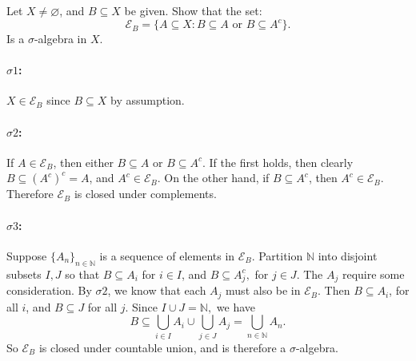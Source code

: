 \documentclass{article}
\begin{document}
\begin{exmp}

    Let $X\neq \varnothing$, and $B\subseteq X$ be given. Show that the set:
    \[
    \mathcal{E}_B=\{A\subseteq X:B\subseteq A \text{ or }B\subseteq A^{c}\} 
    .\] 
    Is a $\sigma$-algebra in $X$.
    
\end{exmp}

\paragraph{$\sigma 1$:} $X\in \mathcal{E}_B$ since $B\subseteq X$ by assumption.
\paragraph{$\sigma 2$:} If $A\in \mathcal{E}_B$, then either $B\subseteq A$ or $B\subseteq A^{c}$. If the first holds, then clearly $B\subseteq (A^{c})^{c}=A$, and $A^{c}\in \mathcal{E}_B$. On the other hand, if $B\subseteq A^{c}$, then $A^{c}\in \mathcal{E}_B$. Therefore $\mathcal{E}_B$ is closed under complements.

\paragraph{$\sigma 3$:} Suppose $\{A_n\} _{n\in \mathbb{N}}$ is a sequence of elements in $\mathcal{E}_B$. Partition $\mathbb{N}$ into disjoint subsets $I,J$ so that $B\subseteq A_i$ for $ i\in I$, and $B\subseteq A_j^{c}, $ for $ j\in J$. The $A_j$ require some consideration. By $\sigma2$, we know that each $A_j$ must also be in $\mathcal{E}_B$. Then $B\subseteq A_i$, for all $i$, and $B\subseteq J$ for all $j$. Since $I\cup J=\mathbb{N}  ,$ we have
\[
B\subseteq \bigcup_{i \in  I} A_i\cup \bigcup_{j\in J} A_j  =\bigcup_{n\in \mathbb{N}} A_n
.\] 
So $\mathcal{E}_B$ is closed under countable union, and is therefore a $\sigma$-algebra.
\end{document}
